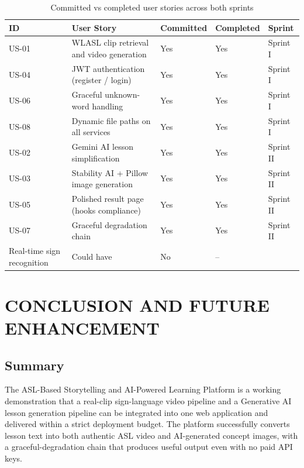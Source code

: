 \documentclass[12pt,a4paper,oneside]{report}
\begin{document}
\begin{table}[h]
\caption{Committed vs completed user stories across both sprints}
\label{tab:committed}
\centering
\small
\begin{tabularx}{\linewidth}{@{}lXlll@{}}
\toprule
\textbf{ID} & \textbf{User Story} & \textbf{Committed} & \textbf{Completed} & \textbf{Sprint} \\
\midrule
US-01 & WLASL clip retrieval and video generation & Yes & Yes & Sprint I \\
US-04 & JWT authentication (register / login) & Yes & Yes & Sprint I \\
US-06 & Graceful unknown-word handling & Yes & Yes & Sprint I \\
US-08 & Dynamic file paths on all services & Yes & Yes & Sprint I \\
US-02 & Gemini AI lesson simplification & Yes & Yes & Sprint II \\
US-03 & Stability AI + Pillow image generation & Yes & Yes & Sprint II \\
US-05 & Polished result page (hooks compliance) & Yes & Yes & Sprint II \\
US-07 & Graceful degradation chain & Yes & Yes & Sprint II \\
Real-time sign recognition & Could have & No & -- \\
\bottomrule
\end{tabularx}
\end{table}

\chapter{CONCLUSION AND FUTURE ENHANCEMENT}

\section{Summary}

The ASL-Based Storytelling and AI-Powered Learning Platform is a working demonstration that a real-clip sign-language video pipeline and a Generative AI lesson generation pipeline can be integrated into one web application and delivered within a strict deployment budget. The platform successfully converts lesson text into both authentic ASL video and AI-generated concept images, with a graceful-degradation chain that produces useful output even with no paid API keys.
\end{document}
